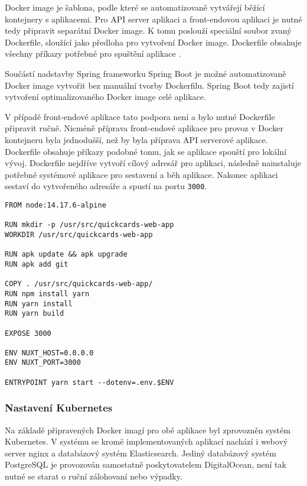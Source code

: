 		Docker image je šablona, podle které se automatizovaně vytvářejí běžící kontejnery s aplikacemi.
		Pro \ac{API} server aplikaci a front-endovou aplikaci je nutné tedy připravit separátní Docker image.
		K tomu poslouží speciální soubor zvaný Dockerfile, sloužící jako předloha pro vytvoření Docker image.
		Dockerfile obsahuje všechny příkazy potřebné pro spuštění aplikace \cite{dockerfile_reference}.

		Součástí nadstavby Spring frameworku Spring Boot je možné automatizovaně Docker image vytvořit bez manuální tvorby
		Dockerfilu.
		Spring Boot tedy zajistí vytvoření optimalizovaného Docker image celé aplikace.

		V případě front-endové aplikace tato podpora není a bylo nutné Dockerfile připravit ručně.
		Nicméně příprava front-endové aplikace pro provoz v Docker kontejneru byla jednodušší, než by byla příprava \ac{API}
		serverové aplikace.
		Dockerfile obsahuje příkazy podobné tomu, jak se aplikace spouští pro lokální vývoj.
		Dockerfile nejdříve vytvoří cílový adresář pro aplikaci, následně nainstaluje potřebné systémové aplikace pro sestavení
		a běh aplikace.
		Nakonec aplikaci sestaví do vytvořeného adresáře a spustí na portu \lstinline{3000}.

		\begin{lstlisting}[caption={Dockerfile spouštějící front-endovou aplikaci v Dockeru. Zdroj: [autor]}]
FROM node:14.17.6-alpine

RUN mkdir -p /usr/src/quickcards-web-app
WORKDIR /usr/src/quickcards-web-app

RUN apk update && apk upgrade
RUN apk add git

COPY . /usr/src/quickcards-web-app/
RUN npm install yarn
RUN yarn install
RUN yarn build

EXPOSE 3000

ENV NUXT_HOST=0.0.0.0
ENV NUXT_PORT=3000

ENTRYPOINT yarn start --dotenv=.env.$ENV
		\end{lstlisting}

		\subsubsection{Nastavení Kubernetes}

		Na základě připravených Docker imagí pro obě aplikace byl zprovozněn systém Kubernetes.
		V systému se kromě implementovaných aplikací nachází i webový server nginx a databázový systém Elasticsearch.
		Jediný databázový systém PostgreSQL je provozován samostatně poskytovatelem DigitalOcean,
		není tak nutné se starat o ruční zálohovaní nebo výpadky.

